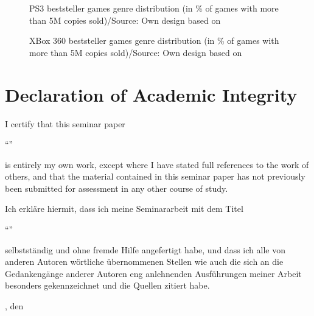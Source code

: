 \documentclass
[
    a4paper,
    11pt
]
{article}
\begin{document}
\begin{appendix}
\begin{figure}[ht!]
\begin{bchart}[step=5,max=55,width=10cm]
      \smallskip
      \smallskip
      \smallskip
      \smallskip
      \smallskip
      \smallskip
		\end{bchart}
    \caption{PS3 beststeller games genre distribution (in \% of games with more than 5M copies sold)/Source: Own design based on \cite{Vgchartz.com2016}}
    \label{fig:ps3bestsellergenres}
\end{figure}
%
%
\begin{figure}[ht!]
    \centering
		\begin{bchart}[step=5,max=55,width=10cm]
      \smallskip
      \smallskip
      \smallskip
      \smallskip
      \smallskip
      \smallskip
		\end{bchart}
    \caption{XBox 360 beststeller games genre distribution (in \% of games with more than 5M copies sold)/Source: Own design based on \cite{Vgchartz.com2016}}
    \label{fig:xb360bestsellergenres}
\end{figure}
%
\end{appendix}
\cleardoublepage
%
\section{Declaration of Academic Integrity}\label{eidesstattliche-erklaerung}
I certify that this seminar paper

``\Arbeitstitel''

is entirely
my own work, except where I have stated full references to the work of others, and
that the material contained in this seminar paper has not previously been submitted
for assessment in any other course of study.
\vspace{0.75cm}

Ich erkläre hiermit, dass ich meine Seminararbeit mit dem Titel

``\Arbeitstitel''

selbstständig und ohne fremde Hilfe angefertigt habe, und dass ich alle
von anderen Autoren wörtliche übernommenen Stellen wie auch die sich an
die Gedankengänge anderer Autoren eng anlehnenden Ausführungen meiner
Arbeit besonders gekennzeichnet und die Quellen zitiert habe.

\vspace{3cm}

\Ort, den \Abgabedatum
\end{document}
